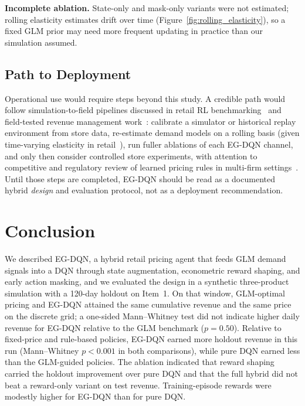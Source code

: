 \documentclass[journal, 10pt, twoside]{IEEEtran}
\begin{document}
\smallskip\noindent\textbf{Incomplete ablation.}
State-only and mask-only variants were not estimated; rolling elasticity
estimates drift over time (Figure~\ref{fig:rolling_elasticity}), so a
fixed GLM prior may need more frequent updating in practice than our
simulation assumed.

\subsection{Path to Deployment}

Operational use would require steps beyond this study.
A credible path would follow simulation-to-field pipelines discussed in
retail RL benchmarking~\cite{xia2024} and field-tested revenue management
work~\cite{chen2023}: calibrate a simulator or historical replay
environment from store data, re-estimate demand models on a rolling basis
(given time-varying elasticity in retail~\cite{zhang2025}), run fuller
ablations of each EG-DQN channel, and only then consider controlled
store experiments, with attention to competitive and regulatory review of
learned pricing rules in multi-firm settings~\cite{denboer2024}.
Until those steps are completed, EG-DQN should be read as a documented
hybrid \emph{design} and evaluation protocol, not as a deployment
recommendation.

\section{Conclusion}
\label{sec:conclusion}

We described EG-DQN, a hybrid retail pricing agent that feeds GLM demand
signals into a DQN through state augmentation, econometric reward shaping,
and early action masking, and we evaluated the design in a synthetic
three-product simulation with a 120-day holdout on Item~1.
On that window, GLM-optimal pricing and EG-DQN attained the same
cumulative revenue and the same price on the discrete grid; a one-sided
Mann--Whitney test did not indicate higher daily revenue for EG-DQN
relative to the GLM benchmark ($p=0.50$).
Relative to fixed-price and rule-based policies, EG-DQN earned more
holdout revenue in this run (Mann--Whitney $p<0.001$ in both
comparisons), while pure DQN earned less than the GLM-guided policies.
The ablation indicated that reward shaping carried the holdout improvement
over pure DQN and that the full hybrid did not beat a reward-only variant
on test revenue.
Training-episode rewards were modestly higher for EG-DQN than for pure DQN.
\end{document}
